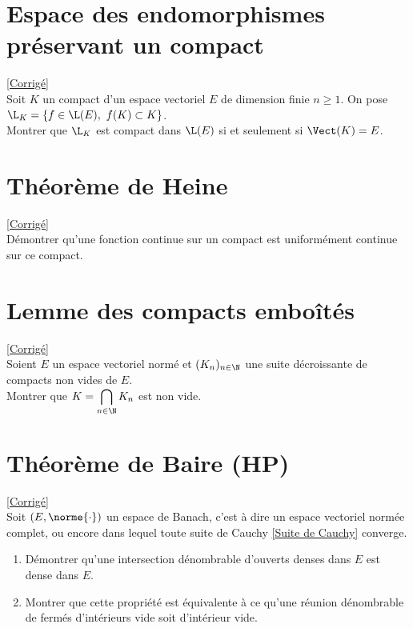 \documentclass{book}
\begin{document}
\section{Espace des endomorphismes préservant un compact }
\label{Espace des endomorphismes préservant un compact}
\textcolor{blue}{\hyperref[Espace des endomorphismes préservant un compact corrigé]{[Corrigé]}}\\
Soit $K$ un compact d'un espace vectoriel $E$ de dimension finie $n\geq 1$. On pose $\L_K=\{f\in \L(E),\ f(K)\subset K\}$.\\
Montrer que $\L_K$ est compact dans $\L(E)$ si et seulement si $\Vect(K)=E$.

\section{Théorème de Heine }
\label{Théorème de Heine}
\textcolor{blue}{\hyperref[sec:theoreme-de-heine]{[Corrigé]}}\\
Démontrer qu'une fonction continue sur un compact est uniformément continue sur ce compact.

\section{Lemme des compacts emboîtés }
\label{Lemme des compacts emboités}
\textcolor{blue}{\hyperref[sec:lemme-des-compacts-emboites-etoile1]{[Corrigé]}}\\
Soient $E$ un espace vectoriel normé et $(K_n)_{n\in \N}$ une suite décroissante de compacts non vides de $E$.\\
Montrer que $K=\displaystyle\bigcap\limits_{n\in \N} K_n$ est non vide.

\section{Théorème de Baire  (HP)}
\label{Théorème de Baire}
\textcolor{blue}{\hyperref[sec:theoreme-de-baire-etoile5]{[Corrigé]}}\\
Soit $(E,\norme{\cdot})$ un espace de Banach, c'est à dire un espace vectoriel normée complet, ou encore dans lequel toute suite de Cauchy \ref{Suite de Cauchy} converge.
\begin{enumerate}
	\item Démontrer qu'une intersection dénombrable d'ouverts denses dans $E$ est dense dans $E$.
	\item Montrer que cette propriété est équivalente à ce qu'une réunion dénombrable de fermés d'intérieurs vide soit d'intérieur vide.
\end{enumerate}
\end{document}
